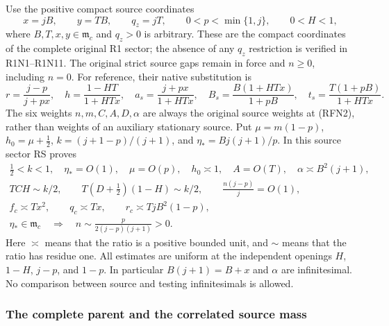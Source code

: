 Use the positive compact source coordinates
\[
 x=jB,\qquad y=TB,\qquad q_z=jT,\qquad
 0<p<\min\{1,j\},\qquad 0<H<1,                         \tag{RFN1}
\]
where $B,T,x,y\in\mathfrak m_c$ and $q_z>0$ is arbitrary. These are
the compact coordinates of the complete original R1 sector; the absence
of any $q_z$ restriction is verified in R1N1--R1N11.  The original
strict source gaps remain in force and $n\geq0$, including $n=0$.
For reference, their native substitution is
\[
 r=\frac{j-p}{j+px},\quad
 h=\frac{1-HT}{1+HTx},\quad
 a_s=\frac{j+px}{1+HTx},\quad
 B_s=\frac{B(1+HTx)}{1+pB},\quad
 t_s=\frac{T(1+pB)}{1+HTx}.                              \tag{RFN2}
\]
The six weights $n,m,C,A,D,\alpha$ are always the original source
weights at (RFN2), rather than weights of an auxiliary stationary
source.  Put $\mu=m(1-p)$, $h_0=\mu+\tfrac12$,
$k=(j+1-p)/(j+1)$, and $\eta_*=Bj(j+1)/p$.
In this source sector RS proves
\begin{gather}
 \tfrac12<k<1,\quad \eta_*=O(1),\quad
 \mu=O(p),\quad h_0\asymp1,\quad A=O(T),\quad
 \alpha\asymp B^2(j+1),                                  \tag{RFN3a}\\
 TCH\sim k/2,\qquad T(D+\tfrac12)(1-H)\sim k/2,\qquad
 \frac{n(j-p)}j=O(1),                                   \tag{RFN3b}\\
 f_c\asymp Tx^2,\qquad q_c\asymp Tx,\qquad
 r_c\asymp TjB^2(1-p),                                  \tag{RFN3c}\\
 \eta_*\in\mathfrak m_c\quad\Longrightarrow\quad
 n\sim\frac{p}{2(j-p)(j+1)}>0.                           \tag{RFN3d}
\end{gather}
Here $\asymp$ means that the ratio is a positive bounded unit, and
$\sim$ means that the ratio has residue one.  All estimates are uniform
at the independent openings $H$, $1-H$, $j-p$, and $1-p$.
In particular $B(j+1)=B+x$ and $\alpha$ are infinitesimal.
No comparison between source and testing infinitesimals is allowed.

\subsubsection*{The complete parent and the correlated source mass}

